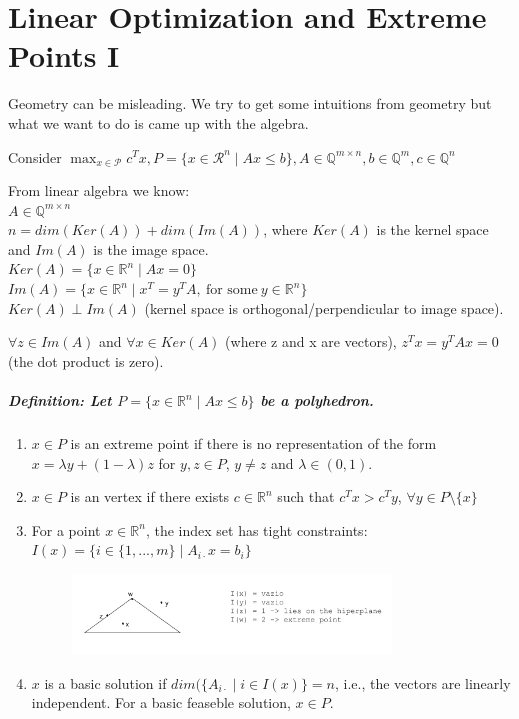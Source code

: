 \documentclass[main]{subfiles}
\begin{document}

\section{Linear Optimization and Extreme Points I}
Geometry can be misleading. We try to get some intuitions from geometry but
what we want to do is came up with the algebra.

Consider $\displaystyle \max_{x \in \mathcal{P}} c^{T}x, P = \{ x \in
\mathcal{R}^{n} \mid Ax \leq b \}, A \in \mathbb{Q}^{m \times n}, b \in
\mathbb{Q}^{m}, c \in \mathbb{Q}^{n}$

From linear algebra we know:\\
$A \in \mathbb{Q}^{m \times n}$\\
$n = dim(Ker(A)) + dim(Im(A))$, where $Ker(A)$ is the kernel space and $Im(A)$
is the image space.\\
$Ker(A) = \{ x \in \mathbb{R}^{n} \mid Ax = 0 \}$ \\
$Im(A) = \{ x \in \mathbb{R}^{n} \mid x^{T} = y^{T}A,\ \text{for some}\ y \in
\mathbb{R}^{n} \}$ \\
$Ker(A) \perp Im(A)$ (kernel space is orthogonal/perpendicular to image space).

$\forall z \in Im(A)$ and $\forall x \in Ker(A)$ (where z and x are vectors),
$z^{T}x = y^{T}Ax = 0$ (the dot product is zero).

\subparagraph{Definition: Let $P = \{ x \in \mathbb{R}^{n} \mid Ax \leq b \}$
be a polyhedron.}
\begin{enumerate}
\item $x \in P$ is an extreme point if there is no representation of the form
$x = \lambda y + (1- \lambda)z$ for $y, z \in P$, $y \neq z$ and $\lambda \in
(0,1)$.
\item $x \in P$ is an vertex if there exists $c \in \mathbb{R}^{n}$ such that
$c^{T}x > c^{T} y$, $\forall y \in P\setminus\{x\}$
\item For a point $x \in \mathbb{R}^{n}$, the index set has tight constraints:
$I(x) = \{i \in \{1, ..., m\} \mid A_{i \cdot}x = b_{i}\}$

\begin{figure}
  \label{fig:indexset}
  \centering
    \includegraphics[width=0.8\textwidth]{imgs/indexset.png}
\end{figure}

\item $x$ is a basic solution if $dim(\{A_{i\cdot} \mid i \in I(x)\} = n$,
i.e., the vectors are linearly independent. For a basic feaseble solution,
$x \in P$.
\end{enumerate}
\end{document}
